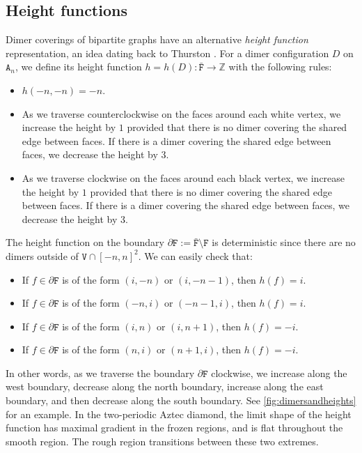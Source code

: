 \documentclass[11pt,twoside]{amsart}
\theoremstyle{plain}
\numberwithin{quest}{section}
\theoremstyle{remark}
\numberwithin{rem}{section}
\theoremstyle{definition}
\newcommand{\Z}{\mathbb{Z}}
\renewcommand{\tt}[1]{{\mathtt{#1}}}
\begin{document}
	\subsection{Height functions}
	\label{S:face-heights}
	Dimer coverings of bipartite graphs have an alternative \emph{height function} representation, an idea dating back to Thurston \cite{Thu:90}. For a dimer configuration $D$ on $\tt{A}_n$, we define its height function $h = h(D):\mathtt{\bar F} \to \Z$ with the following rules:
	\begin{itemize}
		\item $h(-n, -n) = -n$.
		\item As we traverse counterclockwise on the faces around each white vertex, we increase the height by $1$ provided that there is no dimer covering the shared edge between faces.  If there is a dimer covering the shared edge between faces, we decrease the height by 3.
		\item As we traverse clockwise on the faces around each black vertex, we increase the height by $1$  provided that there is no dimer covering the shared edge between faces.  If there is a dimer covering the shared edge between faces, we decrease the height by 3.
	\end{itemize}
	The height function on the boundary $\partial \mathtt{F} := \mathtt{\bar F} \setminus \mathtt{F}$ is deterministic since there are no dimers outside of $\mathtt{V} \cap [-n, n]^2$. We can easily check that:
	\begin{itemize}[nosep]
		\item If $f \in \partial \mathtt{F}$ is of the form $(i, -n)$ or $(i, -n-1)$, then $h(f) = i$.
		\item If $f \in \partial \mathtt{F}$ is of the form $(-n, i)$ or $(-n-1, i)$, then $h(f) = i$.
		\item If $f \in \partial \mathtt{F}$ is of the form $(i, n)$ or $(i, n+1)$, then $h(f) = -i$.
		\item If $f \in \partial \mathtt{F}$ is of the form $(n, i)$ or $(n+1, i)$, then $h(f) = -i$.
	\end{itemize}
	In other words, as we traverse the boundary $\partial \mathtt{F}$ clockwise, we increase along the west boundary, decrease along the north boundary, increase along the east boundary, and then decrease along the south boundary. See \cref{fig:dimersandheights} for an example. In the two-periodic Aztec diamond, the limit shape of the height function has maximal gradient in the frozen regions, and is flat throughout the smooth region. The rough region transitions between these two extremes.
	
\end{document}

